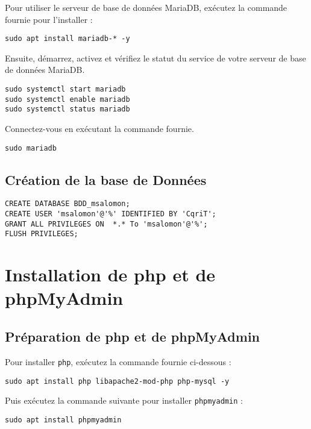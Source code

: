 Pour utiliser le serveur de base de données MariaDB, exécutez la commande fournie pour l'installer :

\begin{lstlisting}
sudo apt install mariadb-* -y
\end{lstlisting}

Ensuite, démarrez, activez et vérifiez le statut du service de votre serveur de base de données MariaDB.

\begin{lstlisting}
sudo systemctl start mariadb
sudo systemctl enable mariadb
sudo systemctl status mariadb
\end{lstlisting}

Connectez-vous en exécutant la commande fournie.
\begin{lstlisting}
sudo mariadb
\end{lstlisting}

\subsection{Création de la base de Données}

\begin{lstlisting}
CREATE DATABASE BDD_msalomon;
CREATE USER 'msalomon'@'%' IDENTIFIED BY 'CqriT';
GRANT ALL PRIVILEGES ON  *.* To 'msalomon'@'%';
FLUSH PRIVILEGES;
\end{lstlisting}

\section{Installation de php et de phpMyAdmin}

\subsection{Préparation de php et de phpMyAdmin}

Pour installer \texttt{php}, exécutez la commande fournie ci-dessous :

\begin{lstlisting}
sudo apt install php libapache2-mod-php php-mysql -y
\end{lstlisting}

Puis exécutez la commande suivante pour installer \texttt{phpmyadmin} :

\begin{lstlisting}
sudo apt install phpmyadmin
\end{lstlisting}

